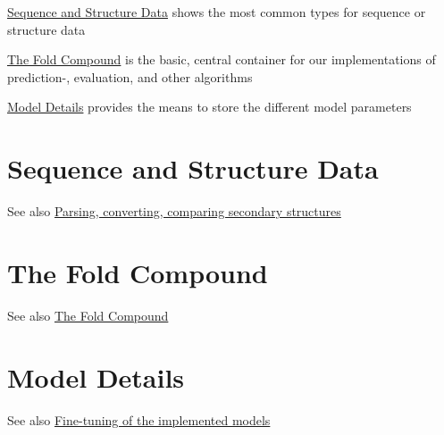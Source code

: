
\begin{DoxyItemize}
\item \hyperlink{sequence_structure_data}{Sequence and Structure Data} shows the most common types for sequence or structure data
\item \hyperlink{fold_compound_container}{The \textquotesingle{}Fold Compound\textquotesingle{}} is the basic, central container for our implementations of prediction-\/, evaluation, and other algorithms
\item \hyperlink{model_settings}{Model Details} provides the means to store the different model parameters 
\end{DoxyItemize}\hypertarget{sequence_structure_data}{}\section{Sequence and Structure Data}\label{sequence_structure_data}
\begin{DoxySeeAlso}{See also}
\hyperlink{group__struct__utils}{Parsing, converting, comparing secondary structures} 
\end{DoxySeeAlso}
\hypertarget{fold_compound_container}{}\section{The \textquotesingle{}Fold Compound\textquotesingle{}}\label{fold_compound_container}
\begin{DoxySeeAlso}{See also}
\hyperlink{group__fold__compound}{The Fold Compound} 
\end{DoxySeeAlso}
\hypertarget{model_settings}{}\section{Model Details}\label{model_settings}
\begin{DoxySeeAlso}{See also}
\hyperlink{group__model__details}{Fine-\/tuning of the implemented models} 
\end{DoxySeeAlso}
